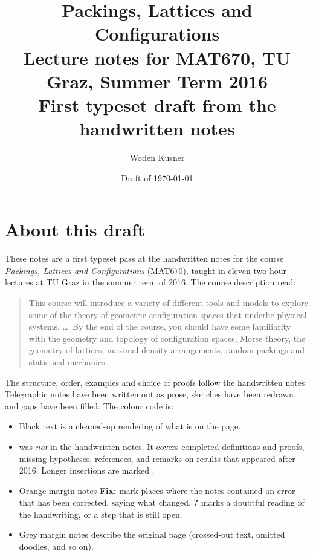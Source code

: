 

\title{\textbf{Packings, Lattices and Configurations}\\[0.6em]
\large Lecture notes for MAT670, TU Graz, Summer Term 2016\\[0.3em]
\normalsize First typeset draft from the handwritten notes}
\author{Woden Kusner}
\date{Draft of \today}


\frontmatter
\maketitle

\chapter*{About this draft}

These notes are a first typeset pass at the handwritten notes for the course
\emph{Packings, Lattices and Configurations} (MAT670), taught in eleven two-hour lectures at TU Graz
in the summer term of 2016. The course description read:
\begin{quote}
This course will introduce a variety of different tools and models to explore some of the theory of
geometric configuration spaces that underlie physical systems. \dots\ By the end of the course, you
should have some familiarity with the geometry and topology of configuration spaces, Morse theory, the
geometry of lattices, maximal density arrangements, random packings and statistical mechanics.
\end{quote}

The structure, order, examples and choice of proofs follow the handwritten notes. Telegraphic notes have
been written out as prose, sketches have been redrawn, and gaps have been filled. The colour code is:

\begin{itemize}
\item Black text is a cleaned-up rendering of what is on the page.
\item {} was \emph{not} in the handwritten notes. It covers completed definitions and
  proofs, missing hypotheses, references, and remarks on results that appeared after 2016.
  Longer insertions are marked \added{\textsf{\small[Added]}}.
\item Orange margin notes \textbf{Fix:} mark places where the notes contained an error that has been
  corrected, saying what changed. \textbf{?} marks a doubtful reading of the handwriting,
  or a step that is still open.
\item Grey margin notes describe the original page (crossed-out text, omitted doodles, and so on).
\end{itemize}

